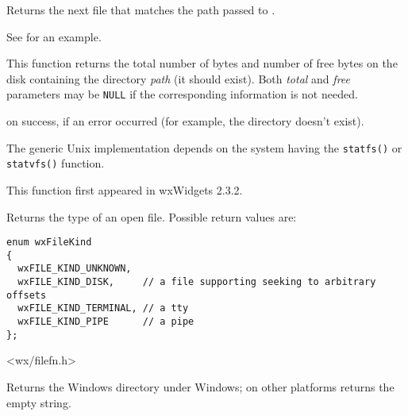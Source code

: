 \label{wxfindnextfile}


Returns the next file that matches the path passed to .

See  for an example.


\label{wxgetdiskspace}


This function returns the total number of bytes and number of free bytes on
the disk containing the directory {\it path} (it should exist). Both
{\it total} and {\it free} parameters may be {\tt NULL} if the corresponding
information is not needed.


\true on success, \false if an error occurred (for example, the
directory doesn't exist).


The generic Unix implementation depends on the system having
the \texttt{statfs()} or \texttt{statvfs()} function.

This function first appeared in wxWidgets 2.3.2.


\label{wxgetfilekind}



Returns the type of an open file. Possible return values are:

\begin{verbatim}
enum wxFileKind
{
  wxFILE_KIND_UNKNOWN,
  wxFILE_KIND_DISK,     // a file supporting seeking to arbitrary offsets
  wxFILE_KIND_TERMINAL, // a tty
  wxFILE_KIND_PIPE      // a pipe
};

\end{verbatim}


<wx/filefn.h>


\label{wxgetosdirectory}


Returns the Windows directory under Windows; on other platforms returns the empty string.


